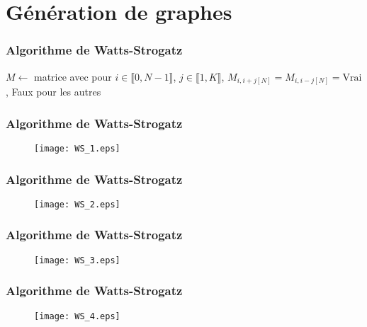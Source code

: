 \documentclass{beamer}
\begin{document}
\section{Génération de graphes}
\begin{frame}
  \frametitle{Algorithme de Watts-Strogatz}
  \fontsize{10}{11}\selectfont
  \begin{algorithm}[H]
  $M \leftarrow $ matrice avec pour $i\in \llbracket0,N-1\rrbracket$, $j\in \llbracket1,K\rrbracket$, $M_{i,i+j[N]} = M_{i,i-j[N]} = \text{Vrai}$, Faux pour les autres \;
  \end{algorithm}
\end{frame} 
\begin{frame}
  \frametitle{Algorithme de Watts-Strogatz}
  \begin{figure}[H]
    \texttt{[image: WS\_1.eps]}
  \end{figure}
\end{frame}

\begin{frame}
  \frametitle{Algorithme de Watts-Strogatz}
  \begin{figure}[H]
    \texttt{[image: WS\_2.eps]}
  \end{figure}
\end{frame}

\begin{frame}
  \frametitle{Algorithme de Watts-Strogatz}
  \begin{figure}[H]
    \texttt{[image: WS\_3.eps]}
  \end{figure}
\end{frame}

\begin{frame}
  \frametitle{Algorithme de Watts-Strogatz}
  \begin{figure}[H]
    \texttt{[image: WS\_4.eps]}
  \end{figure}
\end{frame}
\end{document}
